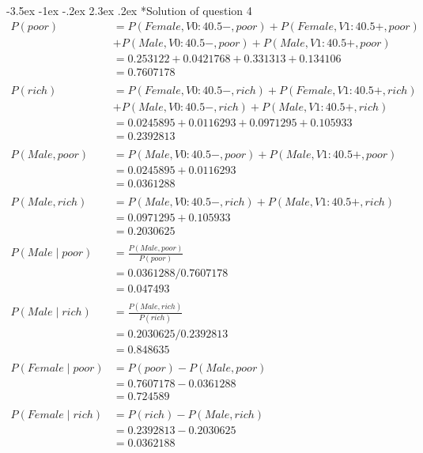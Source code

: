 \documentclass[12pt]{article}
\makeatletter
\renewcommand\section{\@startsection {section}{1}{\z@}%
	{-3.5ex \@plus -1ex \@minus -.2ex}%
	{2.3ex \@plus.2ex}%
	{\normalfont\large\bfseries}}%
\makeatother
\begin{document}
	\section*{Solution of question 4}
	\begin{equation*}
	\begin{aligned}
		P(poor) &= P(Female, V0:40.5-, poor)+P(Female, V1:40.5+, poor)\\
		&+P(Male, V0:40.5-, poor)+P(Male, V1:40.5+, poor)\\
		&=0.253122+0.0421768+0.331313+0.134106\\
		&=0.7607178\\
		\\
		P(rich) &= P(Female, V0:40.5-, rich)+P(Female, V1:40.5+, rich)\\
		&+P(Male, V0:40.5-, rich)+P(Male, V1:40.5+, rich)\\
		&=0.0245895+0.0116293+0.0971295+0.105933\\
		&=0.2392813\\
		\\
		P(Male,poor) &= P(Male, V0:40.5-, poor)+P(Male, V1:40.5+, poor)\\
		&=0.0245895+0.0116293\\
		&=0.0361288\\
		\\
		P(Male,rich) &= P(Male, V0:40.5-, rich)+P(Male, V1:40.5+, rich)\\
		&=0.0971295+0.105933\\
		&=0.2030625\\
		\\
		P(Male\mid poor) &= \frac{P(Male, poor)}{P(poor)}\\
		&=0.0361288/0.7607178\\
		&=0.047493\\
		\\
		P(Male\mid rich) &= \frac{P(Male, rich)}{P(rich)}\\
		&=0.2030625/0.2392813\\
		&=0.848635\\
		\\
		P(Female\mid poor) &= P(poor)-P(Male, poor)\\
		&=0.7607178-0.0361288\\
		&=0.724589\\
		\\
		P(Female\mid rich) &= P(rich)-P(Male, rich)\\
		&=0.2392813-0.2030625\\
		&=0.0362188
	\end{aligned}
	\end{equation*}
	
	
\end{document}
